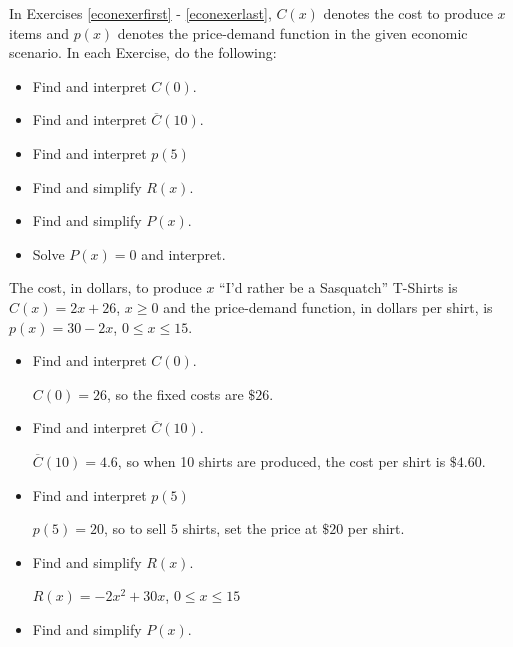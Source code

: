 \documentclass{ximera}
\begin{document}
\begin{question}
    

In Exercises \ref{econexerfirst} - \ref{econexerlast}, $C(x)$ denotes the cost to produce $x$ items and $p(x)$ denotes the price-demand function in the given economic scenario.  In each Exercise, do the following:

\begin{itemize}

\item  Find and interpret $C(0)$.
\item  Find and interpret $\overline{C}(10)$.
\item  Find and interpret $p(5)$
\item  Find and simplify $R(x)$.
\item  Find and simplify $P(x)$.
\item  Solve $P(x) = 0$ and interpret.
\end{itemize}

\begin{problem}\label{econexerfirst}
The cost, in dollars, to produce $x$ ``I'd rather be a Sasquatch'' T-Shirts is $C(x) = 2x+26$, $x \geq 0$ and the price-demand function, in dollars per shirt,  is $p(x) = 30 - 2x$, $0 \leq x \leq 15$. 

\begin{itemize}

\item  Find and interpret $C(0)$.

\begin{solution}
    $C(0) = 26$, so the fixed costs are $\$26$.
\end{solution}
\item  Find and interpret $\overline{C}(10)$.

\begin{solution}
    $\overline{C}(10) = 4.6$, so when 10 shirts are produced, the cost per shirt is $\$4.60$.
\end{solution}
\item  Find and interpret $p(5)$

\begin{solution}
    $p(5) = 20$, so to sell $5$ shirts, set the price at $\$20$ per shirt.
\end{solution}
\item  Find and simplify $R(x)$.

\begin{solution}
    $R(x) = -2x^2+30x$, $0 \leq x \leq 15$
\end{solution}
\item  Find and simplify $P(x)$.


\end{itemize}
\end{problem}
\end{question}
\end{document}
